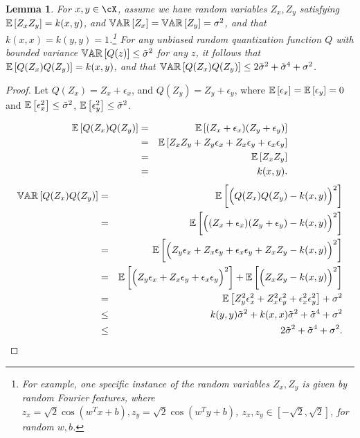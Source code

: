 \documentclass[12pt]{article}
\newcommand{\sq}{\sqrt{2}}
\newcommand{\eps}{\epsilon}
\newcommand{\tsigma}{\tilde{\sigma}}
\newtheorem{lemma}[theorem]{Lemma}
\begin{document}
\begin{lemma}
\label{lemma:var1}
For $x,y\in\cX$, assume we have random variables $Z_x,Z_y$ satisfying $\expect{}{Z_xZ_y} = k(x,y)$, and $\var{}{Z_x} = \var{}{Z_y} = \sigma^2$, and that $k(x,x) = k(y,y) = 1$.\footnote{For example, one specific instance of the random variables $Z_x,Z_y$ is given by random Fourier features, where $z_x = \sq\cos(w^Tx+b),z_y = \sq\cos(w^Ty+b)$, $z_x,z_y\in[-\sq,\sq]$, for random $w,b$.}  For any unbiased random quantization function $Q$ with bounded variance $\var{}{Q(z)} \leq \tsigma^2$ for any $z$, it follows that $\expect{}{Q(Z_x)Q(Z_y)} = k(x,y)$, and that $\var{}{Q(Z_x)Q(Z_y)} \leq 2\tsigma^2 + \tsigma^4 + \sigma^2$.
\end{lemma}
\begin{proof}
Let $Q(Z_x) = Z_x + \eps_x$, and $Q(Z_y) = Z_y + \eps_y$, where $\expect{}{\eps_x} =\expect{}{\eps_y} = 0$ and $\expect{}{\eps_x^2} \leq \tsigma^2$, $\expect{}{\eps_y^2} \leq \tsigma^2$.

\begin{eqnarray*}
\expect{}{Q(Z_x)Q(Z_y)} &=& \expect{}{(Z_x + \eps_x)(Z_y + \eps_y)} \\
&=& \expect{}{Z_xZ_y + Z_y \eps_x + Z_x \eps_y + \eps_x \eps_y} \\
&=& \expect{}{Z_xZ_y} \\
&=& k(x,y).
\end{eqnarray*}
\begin{eqnarray*}
\var{}{Q(Z_x)Q(Z_y)} &=&  \expect{}{\Big(Q(Z_x)Q(Z_y) - k(x,y)\Big)^2} \\
&=& \expect{}{\Big((Z_x + \eps_x)(Z_y + \eps_y) - k(x,y)\Big)^2} \\
&=& \expect{}{\Big(Z_y \eps_x + Z_x\eps_y + \eps_x \eps_y +  Z_xZ_y - k(x,y)\Big)^2} \\
&=& \expect{}{\Big(Z_y \eps_x + Z_x\eps_y + \eps_x \eps_y\Big)^2} +  \expect{}{\Big(Z_xZ_y - k(x,y)\Big)^2} \\
&=& \expect{}{Z_y^2 \eps_x^2 + Z_x^2\eps_y^2 + \eps_x^2 \eps_y^2} +  \sigma^2 \\
&\leq& k(y,y) \tsigma^2 + k(x,x) \tsigma^2 + \tsigma^4 +  \sigma^2 \\
&\leq& 2\tsigma^2 + \tsigma^4 +  \sigma^2. 
\end{eqnarray*}
\end{proof}
\end{document}
